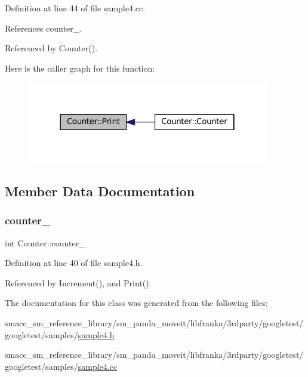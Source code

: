 Definition at line 44 of file sample4.\+cc.



References counter\+\_\+.



Referenced by Counter().


Here is the caller graph for this function\+:
\nopagebreak
\begin{figure}[H]
\begin{center}
\leavevmode
\includegraphics[width=298pt]{classCounter_a80092ec2a0deea0870b2e9f8ad0906bd_icgraph}
\end{center}
\end{figure}


\subsection{Member Data Documentation}
\mbox{\label{classCounter_abdef0bf73f0a68177863c42c6eba2fc0}} 
\subsubsection{\texorpdfstring{counter\+\_\+}{counter\_}}
{\footnotesize\ttfamily int Counter\+::counter\+\_\+\hspace{0.3cm}{\ttfamily [private]}}



Definition at line 40 of file sample4.\+h.



Referenced by Increment(), and Print().



The documentation for this class was generated from the following files\+:\begin{DoxyCompactItemize}
\item 
smacc\+\_\+sm\+\_\+reference\+\_\+library/sm\+\_\+panda\+\_\+moveit/libfranka/3rdparty/googletest/googletest/samples/\hyperlink{sample4_8h}{sample4.\+h}\item 
smacc\+\_\+sm\+\_\+reference\+\_\+library/sm\+\_\+panda\+\_\+moveit/libfranka/3rdparty/googletest/googletest/samples/\hyperlink{sample4_8cc}{sample4.\+cc}\end{DoxyCompactItemize}
